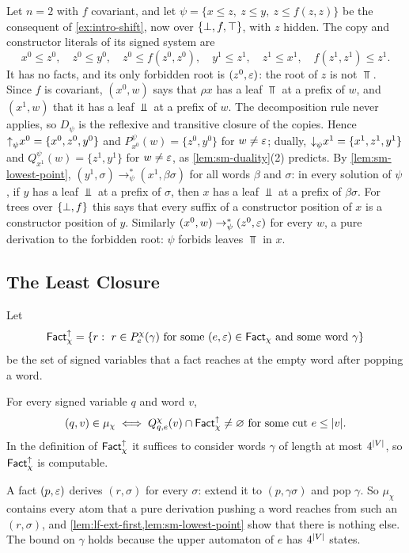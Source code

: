 \begin{example}\label{ex:sm-running}
Let $n=2$ with $f$ covariant, and let
$\psi=\{x\le z,\ z\le y,\ z\le f(z,z)\}$ be the consequent of
\cref{ex:intro-shift}, now over $\{\bot,f,\top\}$, with $z$ hidden. The copy and
constructor literals of its signed system are
\[
 x^0\le z^0,\quad z^0\le y^0,\quad z^0\le f(z^0,z^0),\quad
 y^1\le z^1,\quad z^1\le x^1,\quad f(z^1,z^1)\le z^1 .
\]
It has no facts, and its only forbidden root is $(z^0,\varepsilon)$: the
root of $z$ is not $\Top$. Since $f$ is covariant, $(x^0,w)$ says that $\rho x$
has a leaf $\Top$ at a prefix of $w$, and $(x^1,w)$ that it has a leaf $\Bot$
at a prefix of $w$. The decomposition rule never applies, so $D_\psi$ is the
reflexive and transitive closure of the copies. Hence
$\mathord{\uparrow}_{\psi} x^0=\{x^0,z^0,y^0\}$ and $P^\psi_{x^0}(w)=\{z^0,y^0\}$ for
$w\ne\varepsilon$; dually, $\mathord{\downarrow}_{\psi} x^1=\{x^1,z^1,y^1\}$ and
$Q^\psi_{x^1}(w)=\{z^1,y^1\}$ for $w\ne\varepsilon$, as \cref{lem:sm-duality}(2)
predicts. By \cref{lem:sm-lowest-point}, $(y^1,\sigma)\to^*_\psi(x^1,\beta\sigma)$
for all words $\beta$ and $\sigma$: in every solution of $\psi$, if $y$ has a
leaf $\Bot$ at a prefix of $\sigma$, then $x$ has a leaf $\Bot$ at a prefix of
$\beta\sigma$. For trees over $\{\bot,f\}$ this says that every suffix of a
constructor position of $x$ is a constructor position of $y$. Similarly
$(x^0,w)\to^*_\psi(z^0,\varepsilon)$ for every $w$, a pure derivation to the forbidden
root: $\psi$ forbids leaves $\Top$ in $x$.
\end{example}

\subsection{The Least Closure}\label{sec:sm-regular}

Let
\[
 \mathsf{Fact}^{\uparrow}_{\chi}=\{r:\ r\in P^\chi_e(\gamma)\text{ for some }(e,\varepsilon)\in\mathsf{Fact}_\chi
 \text{ and some word }\gamma\}
\]
be the set of signed variables that a fact reaches at the empty word
after popping a word.

\begin{lemma}\label{lem:sm-mu}
For every signed variable $q$ and word $v$,
\[
 (q,v)\in\mu_\chi\iff Q^\chi_{q,e}(v)\cap\mathsf{Fact}^{\uparrow}_{\chi}\ne\varnothing
 \text{ for some cut }e\le\lvert v\rvert .
\]
In the definition of $\mathsf{Fact}^{\uparrow}_{\chi}$ it suffices to consider words $\gamma$ of length
at most $4^{\lvert V\rvert}$, so $\mathsf{Fact}^{\uparrow}_{\chi}$ is computable.
\end{lemma}

A fact $(p,\varepsilon)$ derives $(r,\sigma)$ for every $\sigma$: extend it
to $(p,\gamma\sigma)$ and pop $\gamma$. So $\mu_\chi$ contains every atom that a
pure derivation pushing a word reaches from such an $(r,\sigma)$, and
\cref{lem:lf-ext-first,lem:sm-lowest-point} show that there is nothing else.
The bound on $\gamma$ holds because the upper automaton of $e$ has $4^{\lvert V\rvert}$
states.

